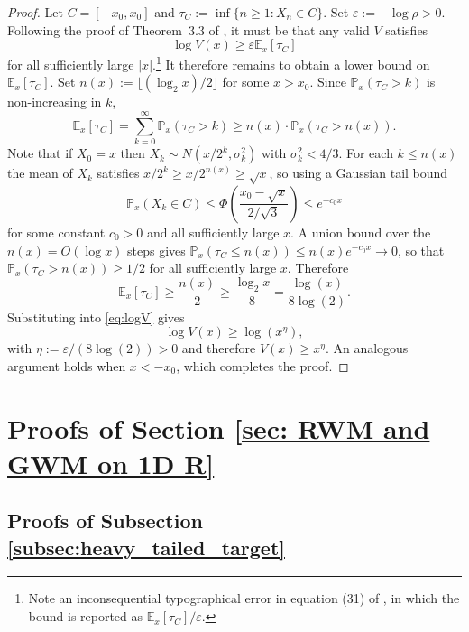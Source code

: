 \documentclass{article}
\theoremstyle{definition}
\theoremstyle{plain}
\begin{document}
\begin{proof}
Let $C = [-x_0, x_0]$ and $\tau_C := \inf\{n \geq 1 : X_n \in C\}$. Set
$\varepsilon := -\log \rho > 0$.  Following the proof of Theorem~3.3 of \cite{mengersen1996rates}, it must be that any valid $V$ satisfies
\begin{equation}\label{eq:logV}
    \log V(x) \geq \varepsilon\mathbb{E}_x[\tau_C]
\end{equation}
for all sufficiently large $|x|$.\footnote{Note an inconsequential typographical error in equation (31) of \cite{mengersen1996rates}, in which the bound is reported as $\mathbb{E}_x[\tau_C]/\varepsilon$.} It therefore remains to obtain a lower bound on
$\mathbb{E}_x[\tau_C]$.  Set $n(x) := \lfloor (\log_2 x)/2 \rfloor$ for some $x > x_0$. Since
$\mathbb{P}_x(\tau_C > k)$ is non-increasing in $k$,
\[
    \mathbb{E}_x[\tau_C]
    = \sum_{k=0}^\infty \mathbb{P}_x(\tau_C > k)
    \geq n(x) \cdot \mathbb{P}_x\left(\tau_C > n(x)\right).
\]
Note that if $X_0 = x$ then $X_k \sim N(x/2^k,
\sigma_k^2)$ with $\sigma_k^2 < 4/3$. For each $k \leq n(x)$ the mean
of $X_k$ satisfies $x/2^k \geq x/2^{n(x)} \geq \sqrt{x}$, so using a Gaussian tail bound
\[
    \mathbb{P}_x(X_k \in C) \leq \Phi \left(\frac{x_0 - \sqrt{x}}{2/\sqrt{3}}\right)
    \leq e^{-c_0 x}
\]
for some constant $c_0 > 0$ and all sufficiently large $x$. A union bound over
the $n(x) = O(\log x)$ steps gives $\mathbb{P}_x(\tau_C \leq n(x)) \leq n(x)e^{-c_0 x}
\to 0$, so that $\mathbb{P}_x(\tau_C > n(x)) \geq 1/2$ for all sufficiently large $x$.
Therefore
\[
    \mathbb{E}_x[\tau_C] \geq \frac{n(x)}{2} \geq \frac{\log_2 x}{8} = \frac{\log(x)}{8\log(2)}.
\]
Substituting into \eqref{eq:logV} gives
\[
    \log V(x) \geq \log(x^\eta),
\]
with $\eta := \varepsilon/(8\log (2)) > 0$ and therefore $V(x) \geq x^{\eta}$.  An analogous argument holds when $x < -x_0$, which completes the proof.
\end{proof}


\section{Proofs of Section \ref{sec: RWM and GWM on 1D R}}
\label{app:proofs_1D_RWM_GWM}


\subsection{Proofs of Subsection \ref{subsec:heavy_tailed_target}}
\label{app:proofs_gwm_polynomialtails}
\end{document}
